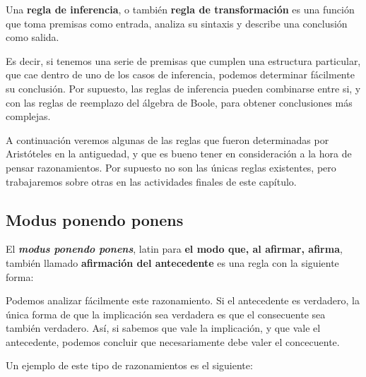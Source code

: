 \begin{definition}
    Una \textbf{regla de inferencia}, o también \textbf{regla de transformación}
    es una función que toma premisas como entrada, analiza su sintaxis y
    describe una conclusión como salida.
\end{definition}

Es decir, si tenemos una serie de premisas que cumplen una estructura
particular, que cae dentro de uno de los casos de inferencia, podemos determinar
fácilmente su conclusión. Por supuesto, las reglas de inferencia pueden
combinarse entre si, y con las reglas de reemplazo del álgebra de Boole, para
obtener conclusiones más complejas.

A continuación veremos  algunas de las reglas que fueron determinadas por
Aristóteles en la antiguedad, y que es bueno tener en consideración a la hora de
pensar razonamientos. Por supuesto no son las únicas reglas existentes, pero
trabajaremos sobre otras en las actividades finales de este capítulo.

\subsection{Modus ponendo ponens}

El \textit{\textbf{modus ponendo ponens}}, latin para \textbf{el modo que, al
afirmar, afirma}, también llamado \textbf{afirmación del antecedente} es una
regla con la siguiente forma:

\begin{minipage}{0.3\textwidth}
    \begin{lreasoning}
        \lpremise{$\Phi \lthen \Psi$}
        \lpremise{$\Phi$}
        \lconclusion{$\Psi$}
    \end{lreasoning}
\end{minipage}

Podemos analizar fácilmente este razonamiento. Si el antecedente es verdadero,
la única forma de que la implicación sea verdadera es que el consecuente sea
también verdadero. Así, si sabemos que vale la implicación, y que vale el
antecedente, podemos concluir que necesariamente debe valer el concecuente.

Un ejemplo de este tipo de razonamientos es el siguiente:

\begin{minipage}{0.5\textwidth}
    \begin{lreasoning}
    \end{lreasoning}
\end{minipage}

